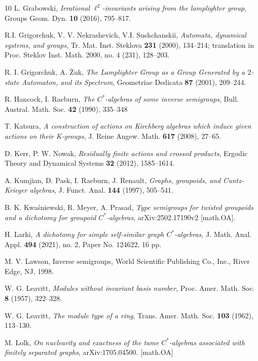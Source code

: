 \documentclass[11pt]{amsart}
\theoremstyle{plain}            %
\theoremstyle{definition}       %
\theoremstyle{definition}       %
\theoremstyle{remark}
\begin{document}
\begin{thebibliography}{10}
	 L. Grabowski, \emph{Irrational $\ell^2$-invariants	arising from the lamplighter group},
	Groups Geom. Dyn. {\bf 10} (2016), 795--817.
	
	 R.I. Grigorchuk, V. V. Nekrashevich, V.I. Sushchanskiĭ, 
	\emph{Automata, dynamical systems, and groups}, Tr. Mat. Inst. Steklova \textbf{231} (2000), 134--214; translation in
	Proc. Steklov Inst. Math. 2000, no. 4 (231), 128--203.
	
	 R. I. Grigorchuk, A. Żuk, \emph{The Lamplighter Group as a Group Generated by a $2$-state Automaton, and its Spectrum},
	Geometriae Dedicata {\bf 87} (2001), 209--244.
	
	
	 R. Hancock, I. Raeburn, \emph{The $C^*$-algebras of some inverse semigroups},
	Bull. Austral. Math. Soc. \textbf{42} (1990), 335--348
	
	
	T. Katsura, \emph{A construction of actions on Kirchberg algebras which induce given actions on their K-groups}, J. Reine Angew. Math. \textbf{617} (2008), 27--65.
	
		
	 D. Kerr, P. W. Nowak, \emph{Residually finite actions
		and crossed products}, Ergodic Theory and Dynamical Systems {\bf 32}
	(2012), 1585--1614.
	
	
	  A. Kumjian, D. Pask, I. Raeburn, J. Renault, \emph{Graphs, groupoids, and Cuntz-Krieger algebras}, J. Funct. Anal. \textbf{144} (1997), 505--541.
		
	 B. K. Kwaśniewski, R. Meyer, A. Prasad, \emph{Type semigroups for twisted groupoids and a dichotomy for groupoid $C^*$-algebras},  arXiv:2502.17190v2 [math.OA].  	
	
	 H. Larki, \emph{A dichotomy for simple self-similar graph $C^*$-algebras}, J. Math. Anal. Appl. \textbf{494} (2021), no. 2, Paper No. 124622, 16 pp. 

      M. V. Lawson, Inverse semigroups, World Scientific Publishing Co., Inc., River Edge, NJ, 1998.

	 W. G. Leavitt, \emph{Modules without invariant basis number},
	Proc. Amer. Math. Soc. \textbf{8} (1957), 322--328.
	
	W. G. Leavitt, \emph{The module type of a ring},
	Trans. Amer. Math. Soc. \textbf{103} (1962), 113--130.

    M. Lolk, \emph{On nuclearity and exactness of the tame $C^*$-algebras associated with finitely separated graphs}, arXiv:1705.04500. [math.OA]


\end{thebibliography}
\end{document}
